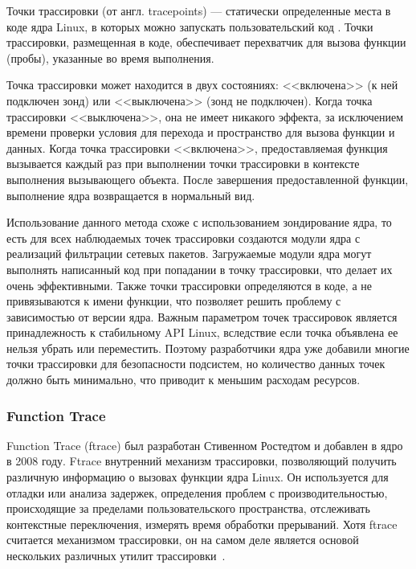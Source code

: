 Точки трассировки (от англ. tracepoints) --- статически определенные места в коде ядра Linux, в которых можно запускать пользовательский код \cite{tracepoint_kernel_linux, declarative_tracepoint}.
Точки трассировки, размещенная в коде, обеспечивает перехватчик для вызова функции (пробы), указанные во время выполнения.

Точка трассировки может находится в двух состояниях: <<включена>> (к ней подключен зонд) или <<выключена>> (зонд не подключен).
Когда точка трассировки <<выключена>>, она не имеет никакого эффекта, за исключением времени проверки условия для перехода и пространство для вызова функции и данных.
Когда точка трассировки  <<включена>>, предоставляемая функция вызывается каждый раз при выполнении точки трассировки в контексте выполнения вызывающего объекта. После завершения предоставленной функции, выполнение ядра возвращается в нормальный вид.

Использование данного метода схоже с использованием зондирование ядра, то есть для всех наблюдаемых точек трассировки создаются модули ядра с реализаций фильтрации сетевых пакетов. Загружаемые модули ядра могут выполнять написанный код при попадании в точку трассировки, что делает их очень эффективными. Также точки трассировки определяются в коде, а не привязываются к имени функции, что позволяет решить проблему с зависимостью от версии ядра. Важным параметром точек трассировок является принадлежность к стабильному API Linux, вследствие если точка объявлена ее нельзя убрать или переместить. Поэтому разработчики ядра уже добавили многие точки трассировки для безопасности подсистем, но количество данных точек должно быть минимально, что приводит к меньшим расходам ресурсов.

\subsubsection{Function Trace}

Function Trace (ftrace) был разработан Стивенном Ростедтом и добавлен в ядро в 2008 году. 
Ftrace внутренний механизм трассировки, позволяющий  получить различную информацию о вызовах функции ядра Linux. 
Он используется для отладки или анализа задержек, определения проблем с производительностью, происходящие за пределами пользовательского пространства, отслеживать контекстные переключения, измерять время обработки прерываний. 
Хотя ftrace считается механизмом трассировки, он на самом деле является основой нескольких различных утилит трассировки~\cite{ftrace_kernel}.

